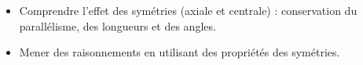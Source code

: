 \begin{prerequis}[Objectifs de 5\up{e}]  
    \begin{itemize}  
        \item Comprendre l’effet des symétries (axiale et centrale) : conservation du parallélisme, des longueurs et des angles.
        \item Mener des raisonnements en utilisant des propriétés des symétries.
    \end{itemize}
\end{prerequis}
